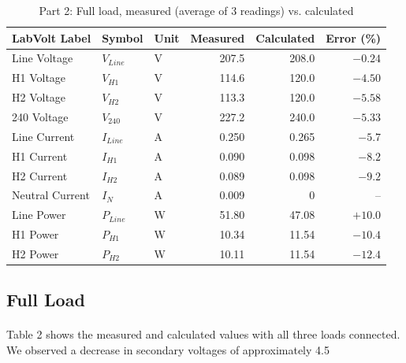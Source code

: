 \begin{table}[htbp]
	\centering
	\caption{Part 2: Full load, measured (average of 3 readings) vs. calculated}
	\label{tab:part2full}
	\begin{tabular}{lllrrr}
		\toprule
		\textbf{LabVolt Label} & \textbf{Symbol} & \textbf{Unit} & \textbf{Measured} & \textbf{Calculated} & \textbf{Error (\%)} \\
		\midrule
		Line Voltage           & $V_{Line}$      & V             & 207.5             & 208.0               & $-0.24$             \\
		H1 Voltage             & $V_{H1}$        & V             & 114.6             & 120.0               & $-4.50$             \\
		H2 Voltage             & $V_{H2}$        & V             & 113.3             & 120.0               & $-5.58$             \\
		240 Voltage            & $V_{240}$       & V             & 227.2             & 240.0               & $-5.33$             \\
		Line Current           & $I_{Line}$      & A             & 0.250             & 0.265               & $-5.7$              \\
		H1 Current             & $I_{H1}$        & A             & 0.090             & 0.098               & $-8.2$              \\
		H2 Current             & $I_{H2}$        & A             & 0.089             & 0.098               & $-9.2$              \\
		Neutral Current        & $I_{N}$         & A             & 0.009             & 0                   & --                  \\
		Line Power             & $P_{Line}$      & W             & 51.80             & 47.08               & $+10.0$             \\
		H1 Power               & $P_{H1}$        & W             & 10.34             & 11.54               & $-10.4$             \\
		H2 Power               & $P_{H2}$        & W             & 10.11             & 11.54               & $-12.4$             \\
		\bottomrule
	\end{tabular}
\end{table}

\subsection{Full Load}
\paragraph{}Table 2 shows the measured and calculated values with all three loads connected. We observed a decrease in secondary voltages of approximately 4.5%

